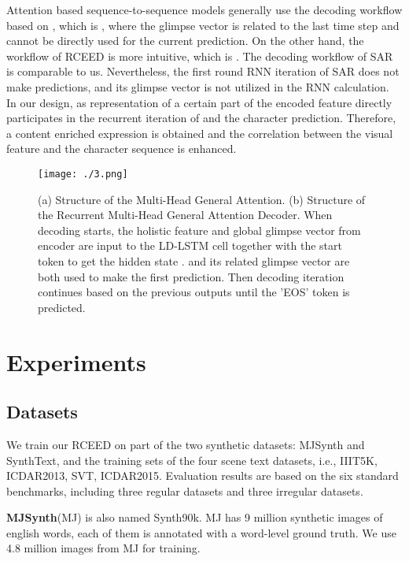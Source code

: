 \documentclass[runningheads]{llncs}
\begin{document}
Attention based sequence-to-sequence models\cite{shi2018aster,litman2020scatter,liao2019mask} generally use the decoding workflow based on \cite{bahdanau2014neural}, which is , where the glimpse vector  is related to the last time step and cannot be directly used for the current prediction. On the other hand, the workflow of RCEED is more intuitive, which is . The decoding workflow of SAR\cite{li2019show} is comparable to us. Nevertheless, the first round RNN iteration of SAR does not make predictions, and its glimpse vector is not utilized in the RNN calculation. In our design,  as representation of a certain part of the encoded feature directly participates in the recurrent iteration of  and the character prediction. Therefore, a content enriched expression is obtained and the correlation between the visual feature and the character sequence is enhanced. 
\begin{figure}
\vspace{-0.2cm}
\setlength{\belowcaptionskip}{-0.6cm} 
\centering
\texttt{[image: ./3.png]}
\caption{(a) Structure of the Multi-Head General Attention.  (b) Structure of the  Recurrent Multi-Head General Attention Decoder. When decoding starts, the holistic feature  and global glimpse vector  from encoder are input to the LD-LSTM cell together with the start token  to get the hidden state .  and its related glimpse vector  are both used to make the first prediction. Then decoding iteration continues based on the previous outputs until the 'EOS' token is predicted.} 
\label{Fig.4}
\end{figure}
\section{Experiments}
\subsection{Datasets}
We train our RCEED on part of the two synthetic datasets: MJSynth and SynthText, and the training sets of the four scene text datasets, i.e., IIIT5K, ICDAR2013, SVT, ICDAR2015. Evaluation results are based on the six standard benchmarks, including three regular datasets and three irregular datasets.

\textbf{MJSynth}(MJ)\cite{jaderberg2014synthetic} is also named Synth90k. MJ has 9 million synthetic images of english words, each of them is annotated with a word-level ground truth. We use 4.8 million images from MJ for training.
\end{document}
